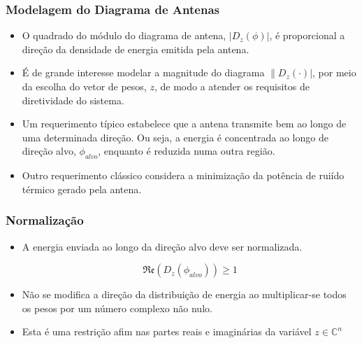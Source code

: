 \begin{frame}
\frametitle{Modelagem do Diagrama de Antenas}
\begin{itemize}
\item O quadrado do módulo do diagrama de antena, $|D_{z}\left( \phi \right)|$, é proporcional a direção da densidade de energia emitida pela antena.

\item \'E de grande interesse modelar a magnitude do diagrama $\| D_{z}\left( \cdot \right) |$, por meio da escolha do vetor de pesos, $z$,  de modo a atender os requisitos de diretividade do sistema.

\item Um requerimento t\'ipico estabelece que a antena transmite bem ao longo de uma determinada direção. Ou seja, a energia é concentrada ao longo de direção alvo, $\phi_{alvo}$, enquanto é reduzida numa outra regi\~ao.

\item Outro requerimento clássico considera a minimização da pot\^encia de rui\'ido térmico gerado pela antena.


\end{itemize}
\end{frame}

\begin{frame}
\frametitle{Normalização}
\begin{itemize}

\item A energia enviada ao longo da direção alvo deve ser normalizada. 

\begin{equation}
\mathfrak{Re} \left( D_{z}\left( \phi_{alvo} \right) \right) \geq 1
\end{equation}

\item  N\~ao se modifica a direção da distribuição de energia ao multiplicar-se todos os pesos por um n\'umero complexo n\~ao nulo. 

\item Esta é uma restrição afim nas partes reais e imaginárias da variável $z \in \mathbb{C}^{n}$

\end{itemize}
\end{frame}

